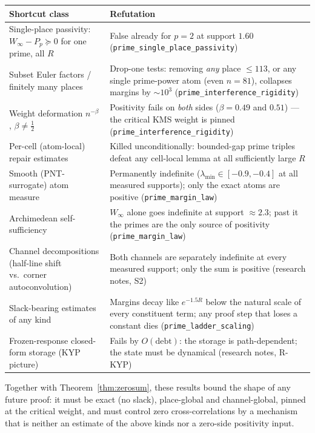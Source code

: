 \documentclass[11pt,reqno]{amsart}
\theoremstyle{plain}
\theoremstyle{definition}
\theoremstyle{remark}
\newcommand{\eigmin}{\lambda_{\min}}
\begin{document}
\begin{center}
\small
\begin{tabular}{p{} p{}}
\toprule
\textbf{Shortcut class} & \textbf{Refutation} \\
\midrule
Single-place passivity: $W_\infty - P_p \succeq 0$ for one prime, all $R$ &
False already for $p = 2$ at support $1.60$
(\texttt{prime\_single\_place\_passivity}) \\[2pt]
Subset Euler factors / finitely many places &
Drop-one tests: removing \emph{any} place $\le 113$, or any single prime-power atom
(even $n = 81$), collapses margins by $\sim\!10^3$
(\texttt{prime\_interference\_rigidity}) \\[2pt]
Weight deformation $n^{-\beta}$, $\beta \ne \tfrac12$ &
Positivity fails on \emph{both} sides ($\beta = 0.49$ and $0.51$) --- the critical KMS
weight is pinned (\texttt{prime\_interference\_rigidity}) \\[2pt]
Per-cell (atom-local) repair estimates &
Killed unconditionally: bounded-gap prime triples \cite{Maynard15} defeat any cell-local
lemma at all sufficiently large $R$ \\[2pt]
Smooth (PNT-surrogate) atom measure &
Permanently indefinite ($\eigmin \in [-0.9, -0.4]$ at all measured supports); only the
exact atoms are positive (\texttt{prime\_margin\_law}) \\[2pt]
Archimedean self-sufficiency &
$W_\infty$ alone goes indefinite at support $\approx 2.3$; past it the primes are the only
source of positivity (\texttt{prime\_margin\_law}) \\[2pt]
Channel decompositions (half-line shift vs.\ corner autoconvolution) &
Both channels are separately indefinite at every measured support; only the sum is positive
(research notes, S2) \\[2pt]
Slack-bearing estimates of any kind &
Margins decay like $e^{-1.5 R}$ below the natural scale of every constituent term; any
proof step that loses a constant dies (\texttt{prime\_ladder\_scaling}) \\[2pt]
Frozen-response closed-form storage (KYP picture) &
Fails by $O(\text{debt})$: the storage is path-dependent; the state must be dynamical
(research notes, R-KYP) \\
\bottomrule
\end{tabular}
\end{center}

Together with Theorem~\ref{thm:zerosum}, these results bound the shape of any future proof:
it must be exact (no slack), place-global and channel-global, pinned at the critical weight,
and must control zero cross-correlations by a mechanism that is neither an estimate of the
above kinds nor a zero-side positivity input.
\end{document}

